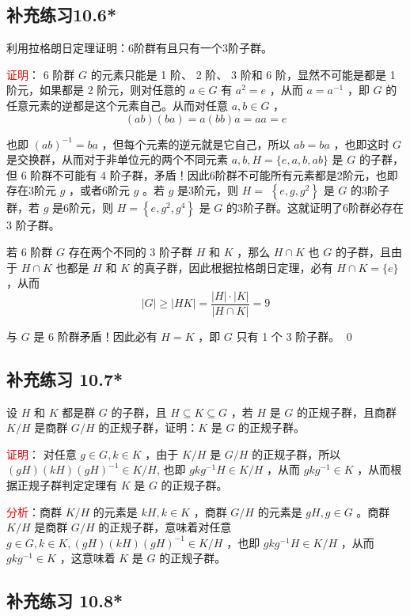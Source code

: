 \documentclass[UTF8, heading=true]{ctexart}
\begin{document}
\subsection{补充练习10.6*}

利用拉格朗日定理证明：6阶群有且只有一个3阶子群。

\textcolor{red}{证明}： 6 阶群 $G$ 的元素只能是 1 阶、 2 阶、 3 阶和 6 阶，显然不可能是都是 1 阶元，如果都是 2 阶元，则对任意的 $a \in G$ 有 $a^2=e$ ，从而 $a=a^{-1}$ ，即 $G$ 的任意元素的逆都是这个元素自己。从而对任意 $a, b \in G$ ，
$$
(a b)(b a)=a(b b) a=a a=e
$$

也即 $(a b)^{-1}=b a$ ，但每个元素的逆元就是它自己，所以 $a b=b a$ ，也即这时 $G$ 是交换群，从而对于非单位元的两个不同元素 $a, b, H=\{e, a, b, a b\}$ 是 $G$ 的子群，但 6 阶群不可能有 4 阶子群，矛盾！因此6阶群不可能所有元素都是2阶元，也即存在3阶元 $g$ ，或者6阶元 $g$ 。若 $g$ 是3阶元，则 $H=$ $\left\{e, g, g^2\right\}$ 是 $G$ 的3阶子群，若 $g$ 是6阶元，则 $H=\left\{e, g^2, g^4\right\}$ 是 $G$ 的3阶子群。这就证明了6阶群必存在 3 阶子群。

若 6 阶群 $G$ 存在两个不同的 3 阶子群 $H$ 和 $K$ ，那么 $H \cap K$ 也 $G$ 的子群，且由于 $H \cap K$ 也都是 $H$ 和 $K$ 的真子群，因此根据拉格朗日定理，必有 $H \cap K=\{e\}$ ，从而
$$
|G| \geq|H K|=\frac{|H| \cdot|K|}{|H \cap K|}=9
$$

与 $G$ 是 6 阶群矛盾！因此必有 $H=K$ ，即 $G$ 只有 1 个 3 阶子群。 \qed

\subsection{补充练习 10.7*}
设 $H$ 和 $K$ 都是群 $G$ 的子群，且 $H \subseteq K \subseteq G$ ，若 $H$ 是 $G$ 的正规子群，且商群 $K / H$ 是商群 $G / H$ 的正规子群，证明：$K$ 是 $G$ 的正规子群。

\textcolor{red}{证明}： 对任意 $g \in G, k \in K$ ，由于 $K / H$ 是 $G / H$ 的正规子群，所以 $(g H)(k H)(g H)^{-1} \in K / H$, 也即 $g k g^{-1} H \in K / H$ ，从而 $g k g^{-1} \in K$ ，从而根据正规子群判定定理有 $K$ 是 $G$ 的正规子群。

\textcolor{red}{分析}：商群 $K / H$ 的元素是 $k H, k \in K$ ，商群 $G / H$ 的元素是 $g H, g \in G$ 。商群 $K / H$ 是商群 $G / H$ 的正规子群，意味着对任意 $g \in G, k \in K,(g H)(k H)(g H)^{-1} \in K / H$ ，也即 $g k g^{-1} H \in K / H$ ，从而 $g k g^{-1} \in K$ ，这意味着 $K$ 是 $G$ 的正规子群。

\subsection{补充练习 10.8*}
\end{document}
